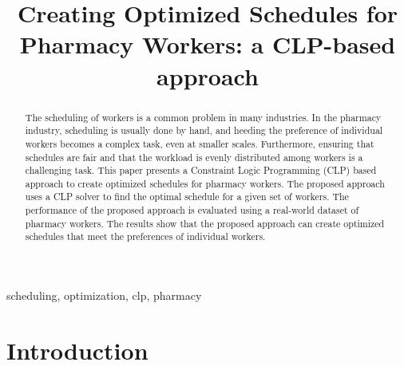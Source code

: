 \documentclass[conference]{IEEEtran}
\begin{document}
\title{
    Creating Optimized Schedules for Pharmacy Workers: a CLP-based approach \\
}

\author{
\and
}

\maketitle

\begin{abstract}

The scheduling of workers is a common problem in many industries.
In the pharmacy industry, scheduling is usually done by hand, and heeding the preference of individual workers becomes a complex task, even at smaller scales. Furthermore, ensuring that schedules are fair and that the workload is evenly distributed among workers is a challenging task.
This paper presents a Constraint Logic Programming (CLP) based approach to create optimized schedules for pharmacy workers. The proposed approach uses a CLP solver to find the optimal schedule for a given set of workers. The performance of the proposed approach is evaluated using a real-world dataset of pharmacy workers. The results show that the proposed approach can create optimized schedules that meet the preferences of individual workers.

\end{abstract}

\begin{IEEEkeywords}
scheduling, optimization, clp, pharmacy
\end{IEEEkeywords}

\section{Introduction}
\end{document}
